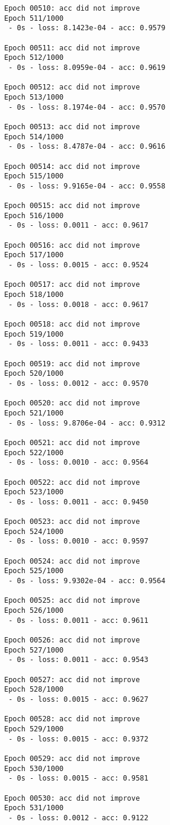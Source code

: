 \documentclass[11pt]{article}
\begin{document}
\begin{Verbatim}[commandchars=\\\{\}]
Epoch 00510: acc did not improve
Epoch 511/1000
 - 0s - loss: 8.1423e-04 - acc: 0.9579

Epoch 00511: acc did not improve
Epoch 512/1000
 - 0s - loss: 8.0959e-04 - acc: 0.9619

Epoch 00512: acc did not improve
Epoch 513/1000
 - 0s - loss: 8.1974e-04 - acc: 0.9570

Epoch 00513: acc did not improve
Epoch 514/1000
 - 0s - loss: 8.4787e-04 - acc: 0.9616

Epoch 00514: acc did not improve
Epoch 515/1000
 - 0s - loss: 9.9165e-04 - acc: 0.9558

Epoch 00515: acc did not improve
Epoch 516/1000
 - 0s - loss: 0.0011 - acc: 0.9617

Epoch 00516: acc did not improve
Epoch 517/1000
 - 0s - loss: 0.0015 - acc: 0.9524

Epoch 00517: acc did not improve
Epoch 518/1000
 - 0s - loss: 0.0018 - acc: 0.9617

Epoch 00518: acc did not improve
Epoch 519/1000
 - 0s - loss: 0.0011 - acc: 0.9433

Epoch 00519: acc did not improve
Epoch 520/1000
 - 0s - loss: 0.0012 - acc: 0.9570

Epoch 00520: acc did not improve
Epoch 521/1000
 - 0s - loss: 9.8706e-04 - acc: 0.9312

Epoch 00521: acc did not improve
Epoch 522/1000
 - 0s - loss: 0.0010 - acc: 0.9564

Epoch 00522: acc did not improve
Epoch 523/1000
 - 0s - loss: 0.0011 - acc: 0.9450

Epoch 00523: acc did not improve
Epoch 524/1000
 - 0s - loss: 0.0010 - acc: 0.9597

Epoch 00524: acc did not improve
Epoch 525/1000
 - 0s - loss: 9.9302e-04 - acc: 0.9564

Epoch 00525: acc did not improve
Epoch 526/1000
 - 0s - loss: 0.0011 - acc: 0.9611

Epoch 00526: acc did not improve
Epoch 527/1000
 - 0s - loss: 0.0011 - acc: 0.9543

Epoch 00527: acc did not improve
Epoch 528/1000
 - 0s - loss: 0.0015 - acc: 0.9627

Epoch 00528: acc did not improve
Epoch 529/1000
 - 0s - loss: 0.0015 - acc: 0.9372

Epoch 00529: acc did not improve
Epoch 530/1000
 - 0s - loss: 0.0015 - acc: 0.9581

Epoch 00530: acc did not improve
Epoch 531/1000
 - 0s - loss: 0.0012 - acc: 0.9122


\end{Verbatim}
\end{document}
